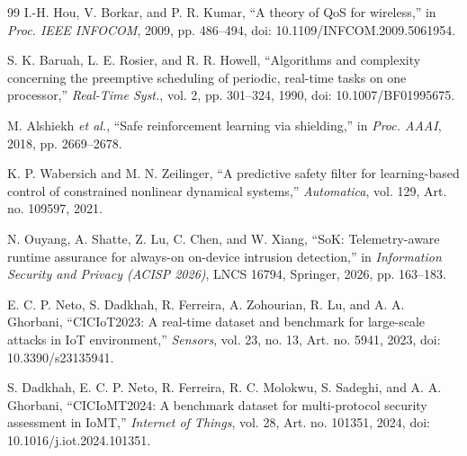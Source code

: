 \documentclass[10pt,journal]{IEEEtran}
\begin{document}
\begin{thebibliography}{99}
I.-H. Hou, V. Borkar, and P. R. Kumar, ``A theory of QoS for wireless,''
in \emph{Proc. IEEE INFOCOM}, 2009, pp. 486--494,
doi: 10.1109/INFCOM.2009.5061954.

S. K. Baruah, L. E. Rosier, and R. R. Howell, ``Algorithms and complexity
concerning the preemptive scheduling of periodic, real-time tasks on one
processor,'' \emph{Real-Time Syst.}, vol. 2, pp. 301--324, 1990,
doi: 10.1007/BF01995675.

M. Alshiekh \emph{et al.}, ``Safe reinforcement learning via shielding,'' in
\emph{Proc. AAAI}, 2018, pp. 2669--2678.

K. P. Wabersich and M. N. Zeilinger,
``A predictive safety filter for learning-based control of constrained
nonlinear dynamical systems,'' \emph{Automatica}, vol. 129, Art. no. 109597,
2021.

N. Ouyang, A. Shatte, Z. Lu, C. Chen, and W. Xiang,
``SoK: Telemetry-aware runtime assurance for always-on on-device intrusion
detection,'' in \emph{Information Security and Privacy (ACISP 2026)},
LNCS 16794, Springer, 2026, pp. 163--183.

E. C. P. Neto, S. Dadkhah, R. Ferreira, A. Zohourian, R. Lu, and A. A. Ghorbani,
``CICIoT2023: A real-time dataset and benchmark for large-scale attacks in IoT
environment,'' \emph{Sensors}, vol. 23, no. 13, Art. no. 5941, 2023,
doi: 10.3390/s23135941.

S. Dadkhah, E. C. P. Neto, R. Ferreira, R. C. Molokwu, S. Sadeghi, and
A. A. Ghorbani, ``CICIoMT2024: A benchmark dataset for multi-protocol
security assessment in IoMT,'' \emph{Internet of Things}, vol. 28,
Art. no. 101351, 2024, doi: 10.1016/j.iot.2024.101351.
\end{thebibliography}
\end{document}
